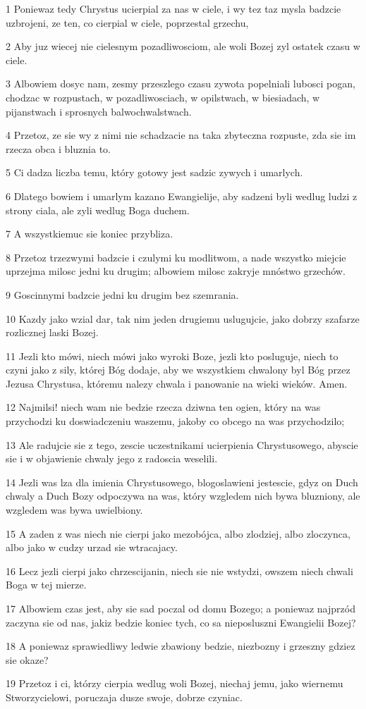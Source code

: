 \par 1 Poniewaz tedy Chrystus ucierpial za nas w ciele, i wy tez taz mysla badzcie uzbrojeni, ze ten, co cierpial w ciele, poprzestal grzechu,
\par 2 Aby juz wiecej nie cielesnym pozadliwosciom, ale woli Bozej zyl ostatek czasu w ciele.
\par 3 Albowiem dosyc nam, zesmy przeszlego czasu zywota popelniali lubosci pogan, chodzac w rozpustach, w pozadliwosciach, w opilstwach, w biesiadach, w pijanstwach i sprosnych balwochwalstwach.
\par 4 Przetoz, ze sie wy z nimi nie schadzacie na taka zbyteczna rozpuste, zda sie im rzecza obca i bluznia to.
\par 5 Ci dadza liczba temu, który gotowy jest sadzic zywych i umarlych.
\par 6 Dlatego bowiem i umarlym kazano Ewangielije, aby sadzeni byli wedlug ludzi z strony ciala, ale zyli wedlug Boga duchem.
\par 7 A wszystkiemuc sie koniec przybliza.
\par 8 Przetoz trzezwymi badzcie i czulymi ku modlitwom, a nade wszystko miejcie uprzejma milosc jedni ku drugim; albowiem milosc zakryje mnóstwo grzechów.
\par 9 Goscinnymi badzcie jedni ku drugim bez szemrania.
\par 10 Kazdy jako wzial dar, tak nim jeden drugiemu uslugujcie, jako dobrzy szafarze rozlicznej laski Bozej.
\par 11 Jezli kto mówi, niech mówi jako wyroki Boze, jezli kto posluguje, niech to czyni jako z sily, której Bóg dodaje, aby we wszystkiem chwalony byl Bóg przez Jezusa Chrystusa, któremu nalezy chwala i panowanie na wieki wieków. Amen.
\par 12 Najmilsi! niech wam nie bedzie rzecza dziwna ten ogien, który na was przychodzi ku doswiadczeniu waszemu, jakoby co obcego na was przychodzilo;
\par 13 Ale radujcie sie z tego, zescie uczestnikami ucierpienia Chrystusowego, abyscie sie i w objawienie chwaly jego z radoscia weselili.
\par 14 Jezli was lza dla imienia Chrystusowego, blogoslawieni jestescie, gdyz on Duch chwaly a Duch Bozy odpoczywa na was, który wzgledem nich bywa bluzniony, ale wzgledem was bywa uwielbiony.
\par 15 A zaden z was niech nie cierpi jako mezobójca, albo zlodziej, albo zloczynca, albo jako w cudzy urzad sie wtracajacy.
\par 16 Lecz jezli cierpi jako chrzescijanin, niech sie nie wstydzi, owszem niech chwali Boga w tej mierze.
\par 17 Albowiem czas jest, aby sie sad poczal od domu Bozego; a poniewaz najprzód zaczyna sie od nas, jakiz bedzie koniec tych, co sa nieposluszni Ewangielii Bozej?
\par 18 A poniewaz sprawiedliwy ledwie zbawiony bedzie, niezbozny i grzeszny gdziez sie okaze?
\par 19 Przetoz i ci, którzy cierpia wedlug woli Bozej, niechaj jemu, jako wiernemu Stworzycielowi, poruczaja dusze swoje, dobrze czyniac.

